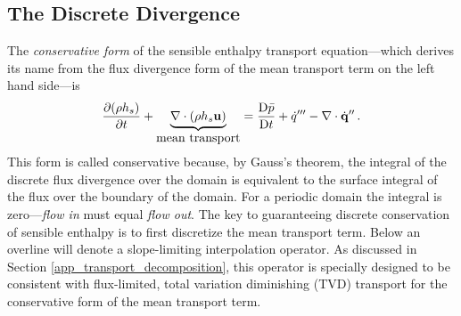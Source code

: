 
\subsection{The Discrete Divergence}
\label{discrete_divergence}

The \emph{conservative form} of the sensible enthalpy transport equation---which derives its name from the flux divergence form of the mean transport term on the left hand side---is
\begin{equation}
\label{eqn_conservative_enthalpy}
\frac{\partial (\rho h_s)}{\partial t} + \underbrace{\nabla\cdot(\rho h_s \mathbf{u})}_{\mbox{mean transport}} = \frac{\mbox{D} \bar{p}}{\mbox{D} t} + \dot{q}^{\prime\prime\prime} - \nabla\cdot \dot{\mathbf{q}}^{\prime\prime} \,\mbox{.}
\end{equation}
This form is called conservative because, by Gauss's theorem, the integral of the discrete flux divergence over the domain is equivalent to the surface integral of the flux over the boundary of the domain.  For a periodic domain the integral is zero---\emph{flow in} must equal \emph{flow out}. The key to guaranteeing discrete conservation of sensible enthalpy is to first discretize the mean transport term.  Below an overline will denote a slope-limiting interpolation operator.  As discussed in Section \ref{app_transport_decomposition}, this operator is specially designed to be consistent with flux-limited, total variation diminishing (TVD) transport for the conservative form of the mean transport term.

